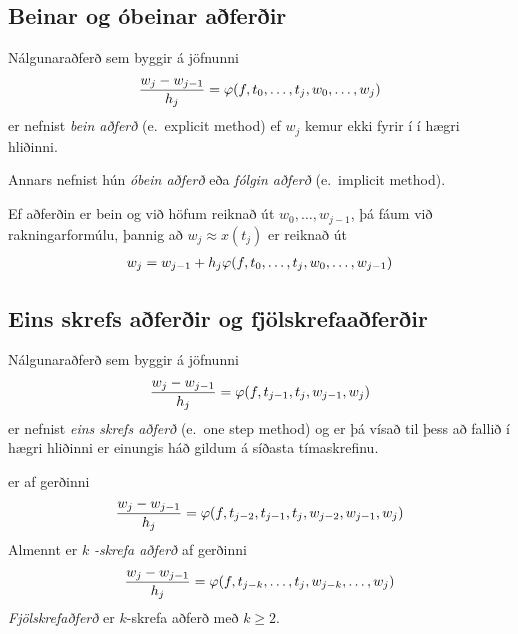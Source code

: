 \documentclass[letterpaper,10pt,icelandic]{sphinxmanual}
\begin{document}
\subsection{Beinar og óbeinar aðferðir}
\label{kafli06:index-5}\label{kafli06:beinar-og-obeinar-aferir}
Nálgunaraðferð sem byggir á jöfnunni
\begin{gather}
\begin{split}\dfrac{w_j-w_{j-1}}{h_j}=\varphi(f,t_{0},\dots,t_j,w_{0},\dots,w_j)\end{split}\notag
\end{gather}
er nefnist \emph{bein aðferð} (e. explicit method) ef \(w_j\) kemur ekki
fyrir í í hægri hliðinni.

Annars nefnist hún \emph{óbein aðferð} eða \emph{fólgin aðferð} (e. implicit
method).

Ef aðferðin er bein og við höfum reiknað út \(w_0,\dots,w_{j-1}\),
þá fáum við rakningarformúlu, þannig að \(w_j\approx x(t_j)\) er
reiknað út
\begin{gather}
\begin{split}w_j=w_{j-1}+h_j\varphi(f,t_{0},\dots,t_j,w_{0},\dots,w_{j-1})\end{split}\notag
\end{gather}

\subsection{Eins skrefs aðferðir og fjölskrefaaðferðir}
\label{kafli06:index-6}\label{kafli06:eins-skrefs-aferir-og-fjolskrefaaferir}
Nálgunaraðferð sem byggir á jöfnunni
\begin{gather}
\begin{split}\dfrac{w_j-w_{j-1}}{h_j}=\varphi(f,t_{j-1},t_j,w_{j-1},w_j)\end{split}\notag
\end{gather}
er nefnist \emph{eins skrefs aðferð} (e. one step method) og er þá vísað til
þess að fallið í hægri hliðinni er einungis háð gildum á síðasta
tímaskrefinu.

er af gerðinni
\begin{gather}
\begin{split}\dfrac{w_j-w_{j-1}}{h_j}=\varphi(f,t_{j-2},t_{j-1},t_j,w_{j-2},w_{j-1},w_j)\end{split}\notag
\end{gather}
Almennt er \(k\) \emph{-skrefa aðferð} af gerðinni
\begin{gather}
\begin{split}\dfrac{w_j-w_{j-1}}{h_j}=\varphi(f,t_{j-k},\dots,t_j,w_{j-k},\dots,w_j)\end{split}\notag
\end{gather}
\emph{Fjölskrefaðferð} er \(k\)-skrefa aðferð með \(k\geq 2\).
\end{document}
